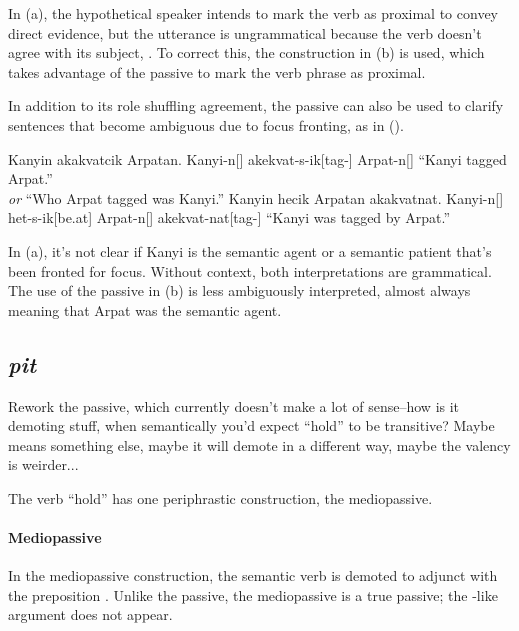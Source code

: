 In (\lastx a), the hypothetical speaker intends to mark the verb as proximal to convey direct evidence, but the utterance is ungrammatical because the verb doesn't agree with its subject, . To correct this, the construction in (\lastx b) is used, which takes advantage of the passive to mark the verb phrase as proximal.

\par In addition to its role shuffling agreement, the  passive can also be used to clarify sentences that become ambiguous due to focus fronting, as in (\nextx).

\begin{gloss*}
\a \begingl
\glpreamble Kanyin akakvatcik Arpatan. \endpreamble
Kanyi-n[]
akekvat-s-ik[tag-]
Arpat-n[]
\glft “Kanyi tagged Arpat.” \\ \textit{or} “Who Arpat tagged was Kanyi.”
\endgl
\a \begingl
\glpreamble Kanyin hecik Arpatan akakvatnat. \endpreamble
Kanyi-n[]
het-s-ik[be.at]
Arpat-n[]
akekvat-nat[tag-]
\glft “Kanyi was tagged by Arpat.”
\endgl
\end{gloss*}

In (\lastx a), it's not clear if Kanyi is the semantic agent or a semantic patient that's been fronted for focus. Without context, both interpretations are grammatical. The use of the passive in (\lastx b) is less ambiguously interpreted, almost always meaning that Arpat was the semantic agent.

\subsection{\textit{pit}}
\begin{kaobox}[frametitle=\sc todo:]
    Rework the  passive, which currently doesn't make a lot of sense--how is it demoting stuff, when semantically you'd expect “hold” to be transitive? Maybe  means something else, maybe it will demote in a different way, maybe the valency is weirder...
\end{kaobox}
The verb  “hold” has one periphrastic construction, the mediopassive. 

\paragraph{Mediopassive}
In the mediopassive construction, the semantic verb is demoted to adjunct with the preposition . Unlike the  passive, the  mediopassive is a true passive; the -like argument does not appear.
